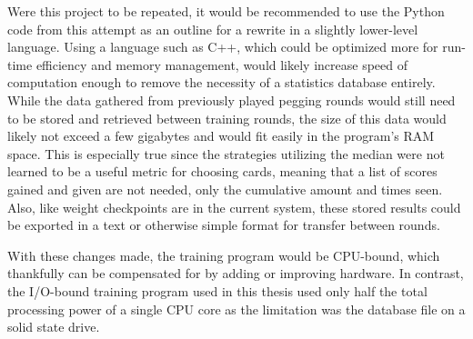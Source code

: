Were this project to be repeated,
it would be recommended to use the Python code from this attempt as an outline
for a rewrite in a slightly lower-level language.
%
Using a language such as C++,
which could be optimized more for run-time efficiency and memory management,
would likely increase speed of computation enough to remove the necessity
of a statistics database entirely.
%
While the data gathered from previously played pegging rounds would still need
to be stored and retrieved between training rounds,
the size of this data would likely not exceed a few gigabytes and would fit
easily in the program's RAM space.
%
This is especially true since the strategies utilizing the median were not
learned to be a useful metric for choosing cards,
meaning that a list of scores gained and given are not needed,
only the cumulative amount and times seen.
%
Also,
like weight checkpoints are in the current system,
these stored results could be exported in a text or otherwise simple format
for transfer between rounds.

With these changes made,
the training program would be CPU-bound,
which thankfully can be compensated for by adding or improving hardware.
%
In contrast,
the I/O-bound training program used in this thesis used only half the total
processing power of a single CPU core
as the limitation was the database file on a solid state drive.

